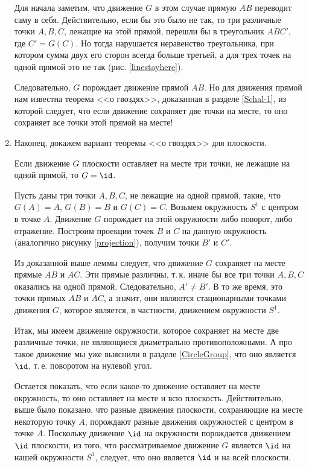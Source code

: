 \begin{enumerate}
Для начала заметим, что движение $G$ в этом случае прямую $AB$ переводит саму в себя. Действительно, если бы это было не так, то три различные точки $A,B,C$, лежащие на этой прямой, перешли бы в треугольник $ABC'$, где $C'=G(C)$. Но тогда нарушается неравенство треугольника, при котором сумма двух его сторон всегда больше третьей, а для трех точек на одной прямой это не так (рис. \ref{linestayhere}).

Следовательно, $G$ порождает движение прямой $AB$. Но для движения прямой нам известна теорема <<о гвоздях>>, доказанная в разделе \ref{Schal-1}, из которой следует, что если движение сохраняет две точки на месте, то оно сохраняет все точки этой прямой на месте!
\epf

\item Наконец, докажем вариант теоремы <<о гвоздях>> для плоскости.
\begin{thrm}
Если движение $G$ плоскости оставляет на месте три точки, не лежащие на одной прямой, то $G=\id$.
\end{thrm}
\pf
Пусть даны три точки $A,B,C$, не лежащие на одной прямой, такие, что $G(A)=A$, $G(B)=B$ и $G(C)=C$. Возьмем окружность $S^1$ с центром в точке $A$. Движение $G$ порождает на этой окружности либо поворот, либо отражение. Построим проекции точек $B$ и $C$ на данную окружность (аналогично рисунку \ref{projection}), получим точки $B'$ и $C'$.

Из доказанной выше леммы следует, что движение $G$ сохраняет на месте прямые $AB$ и $AC$. Эти прямые различны, т.\,к. иначе бы все три точки $A,B,C$ оказались на одной прямой. Следовательно, $A'\ne B'$. В то же время, это точки прямых $AB$ и $AC$, а значит, они являются стационарными точками движения $G$, которое является, в частности, движением окружности $S^1$. 

Итак, мы имеем движение окружности, которое сохраняет на месте две различные точки, не являющиеся диаметрально противоположными. А про такое движение мы уже выяснили в разделе \ref{CircleGroup}, что оно является $\id$, т.\,е. поворотом на нулевой угол.

Остается показать, что если какое-то движение оставляет на месте окружность, то оно оставляет на месте и всю плоскость. Действительно, выше было показано, что разные движения плоскости, сохраняющие на месте некоторую точку $A$, порождают разные движения окружностей с центром в точке $A$. Поскольку движение $\id$ на окружности порождается движением $\id$ плоскости, из того, что рассматриваемое движение $G$ является $\id$ на нашей окружности $S^1$, следует, что оно является $\id$ и на всей плоскости.
\epf


\end{enumerate}
